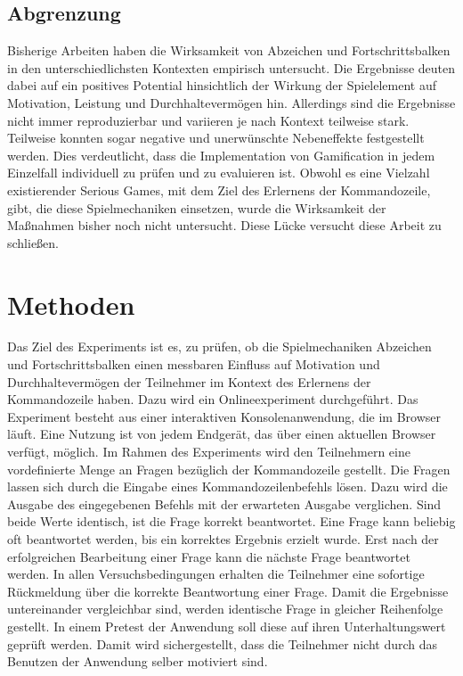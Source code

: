 \documentclass[
    a4paper,
    doc,
    12pt,
    natbib,
]{apa6}
\begin{document}
\subsection{Abgrenzung}
Bisherige Arbeiten haben die Wirksamkeit von Abzeichen und Fortschrittsbalken in den unterschiedlichsten Kontexten empirisch untersucht.
Die Ergebnisse deuten dabei auf ein positives Potential hinsichtlich der Wirkung der Spielelement auf Motivation, Leistung und Durchhaltevermögen hin. Allerdings sind die Ergebnisse nicht immer reproduzierbar und variieren je nach Kontext teilweise stark. Teilweise konnten sogar negative und unerwünschte Nebeneffekte festgestellt werden. Dies verdeutlicht, dass die Implementation von Gamification in jedem Einzelfall individuell zu prüfen und zu evaluieren ist.
Obwohl es eine Vielzahl existierender Serious Games, mit dem Ziel des Erlernens der Kommandozeile, gibt, die diese Spielmechaniken einsetzen, wurde die Wirksamkeit der Maßnahmen bisher noch nicht untersucht. Diese Lücke versucht diese Arbeit zu schließen.

\section{Methoden}
Das Ziel des Experiments ist es, zu prüfen, ob die Spielmechaniken Abzeichen und Fortschrittsbalken einen messbaren Einfluss auf Motivation und Durchhaltevermögen der Teilnehmer im Kontext des Erlernens der Kommandozeile haben. Dazu wird ein Onlineexperiment durchgeführt. Das Experiment besteht aus einer interaktiven Konsolenanwendung, die im Browser läuft. Eine Nutzung ist von jedem Endgerät, das über einen aktuellen Browser verfügt, möglich. Im Rahmen des Experiments wird den Teilnehmern eine vordefinierte Menge an Fragen bezüglich der Kommandozeile gestellt. Die Fragen lassen sich durch die Eingabe eines Kommandozeilenbefehls lösen. Dazu wird die Ausgabe des eingegebenen Befehls mit der erwarteten Ausgabe verglichen. Sind beide Werte identisch, ist die Frage korrekt beantwortet. Eine Frage kann beliebig oft beantwortet werden, bis ein korrektes Ergebnis erzielt wurde. Erst nach der erfolgreichen Bearbeitung einer Frage kann die nächste Frage beantwortet werden.
In allen Versuchsbedingungen erhalten die Teilnehmer eine sofortige Rückmeldung über die korrekte Beantwortung einer Frage. Damit die Ergebnisse untereinander vergleichbar sind, werden identische Frage in gleicher Reihenfolge gestellt.
In einem Pretest der Anwendung soll diese auf ihren Unterhaltungswert geprüft werden. Damit wird sichergestellt, dass die Teilnehmer nicht durch das Benutzen der Anwendung selber motiviert sind. 
  
\end{document}

